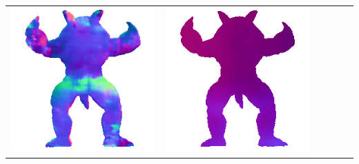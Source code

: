 \begin{center}
\begin{tabularx}{\linewidth}{@{}Y@{}Y@{}Y@{}Y@{}Y@{}Y@{}}
\includegraphics[width=\linewidth]{semisynthetic/20150514_22_marrnet_out.png} &
\includegraphics[width=\linewidth]{semisynthetic/20150514_22_ef_out.png} \\

\end{tabularx}
\end{center}
